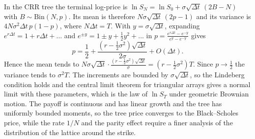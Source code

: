 In the CRR tree the terminal log-price is $\ln S_N=\ln S_0+\sigma\sqrt{\Delta t}\,(2B-N)$ with $B\sim\mathrm{Bin}(N,p)$.
Its mean is therefore $N\sigma\sqrt{\Delta t}\,(2p-1)$ and its variance is $4N\sigma^2\Delta t\,p(1-p)$, where $N\Delta t=T$.
With $y=\sigma\sqrt{\Delta t}$, expanding $e^{r\Delta t}=1+r\Delta t+\dots$ and $e^{\pm y}=1\pm y+\tfrac12y^2+\dots$ in $p=\frac{e^{r\Delta t}-e^{-y}}{e^{y}-e^{-y}}$ gives
\begin{equation}
p=\frac12+\frac{(r-\frac12\sigma^2)\sqrt{\Delta t}}{2\sigma}+O(\Delta t).
\end{equation}
Hence the mean tends to $N\sigma\sqrt{\Delta t}\cdot\frac{(r-\frac12\sigma^2)\sqrt{\Delta t}}{\sigma}=(r-\tfrac12\sigma^2)T$.
Since $p\to\tfrac12$ the variance tends to $\sigma^2T$.
The increments are bounded by $\sigma\sqrt{\Delta t}$, so the Lindeberg condition holds and the central limit theorem for triangular arrays gives a normal limit with these parameters, which is the law of $\ln S_T$ under geometric Brownian motion.
The payoff is continuous and has linear growth and the tree has uniformly bounded moments, so the tree price converges to the Black--Scholes price, while the rate $1/N$ and the parity effect require a finer analysis of the distribution of the lattice around the strike.
